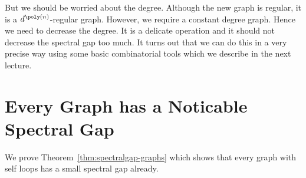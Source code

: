 But we should be worried about the degree. Although the new graph is regular, it is a $d^{\poly(n)}$-regular graph. However, we require a constant degree graph.  Hence we need to decrease the degree. It is a delicate operation and it should not decrease the spectral gap too much. It turns out that we can do this in a very precise way using some basic combinatorial tools which we describe in the next lecture. 

\section{Every Graph has a Noticable Spectral Gap}

We prove Theorem~\ref{thm:spectralgap-graphs} which shows that every graph with self loops has a small spectral gap already.

